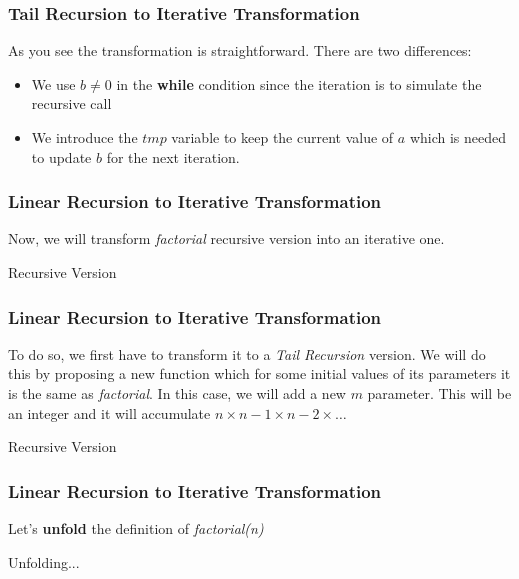 \documentclass{beamer}
\begin{document}
\begin{frame}
	\frametitle{Tail Recursion to Iterative Transformation}
	As you see the transformation is straightforward. There are two differences:
	\begin{itemize}
		\item We use $b\neq 0$ in the \textbf{while} condition since the iteration is to simulate the recursive call
		\item We introduce the $tmp$ variable to keep the current value of $a$ which is needed to update $b$ for the next iteration.
	\end{itemize}
\end{frame}
\begin{frame}
	\frametitle{Linear Recursion to Iterative Transformation}
	Now, we will transform \textit{factorial} recursive version into an iterative one.
	\begin{block}{Recursive Version}
				\begin{algorithmic}[1]
					\State{}
				\Else
					\State{}
				\EndIf
				\EndProcedure
			\end{algorithmic}
	\end{block}
\end{frame}
\begin{frame}
	\frametitle{Linear Recursion to Iterative Transformation}
	To do so, we first have to transform it to a \textit{Tail Recursion} version. We will do this by proposing a new function which for some initial values of its parameters it is the same as \textit{factorial}. In this case, we will add a new $m$ parameter. This will be an integer and it will accumulate $n\times n-1\times n-2\times \ldots$
	\begin{block}{Recursive Version}
			\begin{algorithmic}[1]
					\State{}
				\EndProcedure
			\end{algorithmic}
	\end{block}
\end{frame}
\begin{frame}
	\frametitle{Linear Recursion to Iterative Transformation}
	Let's \textbf{unfold} the definition of \textit{factorial(n)}
	\begin{block}{Unfolding...}
		\begin{algorithmic}[1]
				\State{}
			\Else
				\State{}
			\EndIf
			\EndProcedure
		\end{algorithmic}
	\end{block}
\end{frame}
\end{document}

